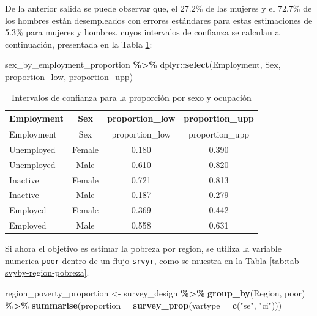 \documentclass[
  spanish,
  12pt,
]{book}
\newenvironment{Shaded}{\begin{snugshade}}{\end{snugshade}}
\newcommand{\AttributeTok}[1]{\textcolor[rgb]{0.13,0.29,0.53}{#1}}
\newcommand{\FunctionTok}[1]{\textcolor[rgb]{0.13,0.29,0.53}{\textbf{#1}}}
\newcommand{\NormalTok}[1]{#1}
\newcommand{\OtherTok}[1]{\textcolor[rgb]{0.56,0.35,0.01}{#1}}
\newcommand{\SpecialCharTok}[1]{\textcolor[rgb]{0.81,0.36,0.00}{\textbf{#1}}}
\newcommand{\StringTok}[1]{\textcolor[rgb]{0.31,0.60,0.02}{#1}}
\begin{document}
De la anterior salida se puede observar que, el 27.2\% de las mujeres y el 72.7\% de los hombres están desempleados con errores estándares para estas estimaciones de 5.3\% para mujeres y hombres. cuyos intervalos de confianza se calculan a continuación, presentada en la Tabla \ref{tab:tab-confint-empleo-sexo}:

\begin{Shaded}
\begin{Highlighting}[]
\NormalTok{sex\_by\_employment\_proportion }\SpecialCharTok{\%\textgreater{}\%}
\NormalTok{  dplyr}\SpecialCharTok{::}\FunctionTok{select}\NormalTok{(Employment, Sex, proportion\_low, proportion\_upp)}
\end{Highlighting}
\end{Shaded}

\begin{longtable}[]{@{}lccc@{}}
\caption{\label{tab:tab-confint-empleo-sexo}Intervalos de confianza para la proporción por sexo y ocupación}\tabularnewline
\toprule\noalign{}
Employment & Sex & proportion\_low & proportion\_upp \\
\midrule\noalign{}
\endfirsthead
\toprule\noalign{}
Employment & Sex & proportion\_low & proportion\_upp \\
\midrule\noalign{}
\endhead
\bottomrule\noalign{}
\endlastfoot
Unemployed & Female & 0.180 & 0.390 \\
Unemployed & Male & 0.610 & 0.820 \\
Inactive & Female & 0.721 & 0.813 \\
Inactive & Male & 0.187 & 0.279 \\
Employed & Female & 0.369 & 0.442 \\
Employed & Male & 0.558 & 0.631 \\
\end{longtable}

Si ahora el objetivo es estimar la pobreza por region, se utiliza la variable numerica \texttt{poor} dentro de un flujo \texttt{srvyr}, como se muestra en la Tabla \ref{tab:tab-svyby-region-pobreza}.

\begin{Shaded}
\begin{Highlighting}[]
\NormalTok{region\_poverty\_proportion }\OtherTok{\textless{}{-}}\NormalTok{ survey\_design }\SpecialCharTok{\%\textgreater{}\%}
  \FunctionTok{group\_by}\NormalTok{(Region, poor) }\SpecialCharTok{\%\textgreater{}\%}
  \FunctionTok{summarise}\NormalTok{(}\AttributeTok{proportion =} \FunctionTok{survey\_prop}\NormalTok{(}\AttributeTok{vartype =} \FunctionTok{c}\NormalTok{(}\StringTok{"se"}\NormalTok{, }\StringTok{"ci"}\NormalTok{)))}
\end{Highlighting}
\end{Shaded}
\end{document}
